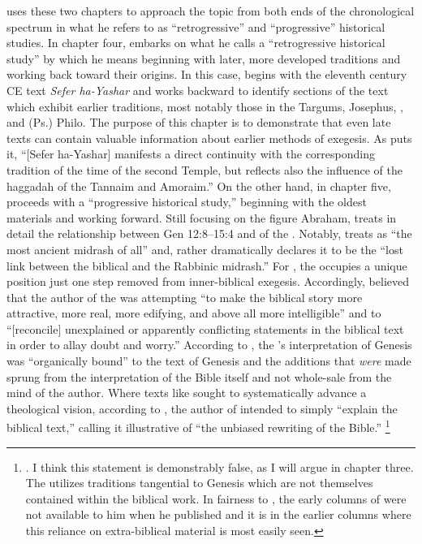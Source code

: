 \vermes uses these two chapters to approach the topic from both ends of the chronological spectrum in what he refers to as ``retrogressive'' and ``progressive'' historical studies. In chapter four, \vermes embarks on what he calls a ``retrogressive historical study'' by which he means beginning with later, more developed traditions and working back toward their origins. In this case, \vermes begins with the eleventh century CE text \emph{Sefer ha-Yashar} and works backward to identify sections of the text which exhibit earlier traditions, most notably those in the Targums, Josephus, \jub, and (Ps.) Philo. The purpose of this chapter is to demonstrate that even late texts can contain valuable information about earlier methods of exegesis. As \vermes puts it, ``[Sefer ha-Yashar] manifests a direct continuity with the corresponding tradition of the time of the second Temple, but reflects also the influence of the haggadah of the Tannaim and Amoraim.''%
    \autocite[95]{vermes1961}
On the other hand, in chapter five, \vermes proceeds with a ``progressive historical study,'' beginning with the oldest materials and working forward. Still focusing on the figure Abraham, \vermes treats in detail the relationship between Gen 12:8--15:4 and  of the \ga. Notably, \vermes treats \ga as ``the most ancient midrash of all''%
    \autocite[124]{vermes1961}
and, rather dramatically declares it to be the ``lost link between the biblical and the Rabbinic midrash.''%
    \autocite[124]{vermes1961}
For \vermes, the \ga occupies a unique position just one step removed from inner-biblical exegesis. Accordingly, \vermes believed that the author of the \ga was attempting ``to make the biblical story more attractive, more real, more edifying, and above all more intelligible'' and to ``[reconcile] unexplained or apparently conflicting statements in the biblical text in order to allay doubt and worry.''%
    \autocite[126]{vermes1961}
According to \vermes, the \ga's interpretation of Genesis was ``organically bound'' to the text of Genesis and the additions that \emph{were} made sprung from the interpretation of the Bible itself and not whole-sale from the mind of the author. Where texts like \jub sought to systematically advance a theological vision, according to \vermes, the author of \ga intended to simply ``explain the biblical text,'' calling it illustrative of ``the unbiased rewriting of the Bible.''%
    \footnote{\cite[126]{vermes1961}. I think this statement is demonstrably false, as I will argue in chapter three. The \ga utilizes traditions tangential to Genesis which are not themselves contained within the biblical work. In fairness to \vermes, the early columns of \ga were not available to him when he published  and it is in the earlier columns where this reliance on extra-biblical material is most easily seen.}

